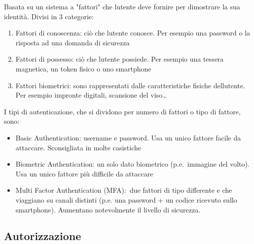 \documentclass[
]{article}
\providecommand{\tightlist}{%
  \setlength{\itemsep}{0pt}\setlength{\parskip}{0pt}}
\begin{document}
{Basata su un sistema a "fattori" che l\textquotesingle utente deve
fornire per dimostrare la sua identità. Divisi in 3 categorie:}

\begin{enumerate}
\tightlist
\item
  {Fattori di conoscenza}{: }{ciò che l\textquotesingle utente
  conosce}{. Per esempio una password o la risposta ad una domanda di
  sicurezza }
\end{enumerate}

{}

\begin{enumerate}
\setcounter{enumi}{1}
\tightlist
\item
  {Fattori di possesso}{: }{ciò che l\textquotesingle utente possiede}{.
  Per esempio una tessera magnetica, un token fisico o uno smartphone }
\item
  {Fattori biometrici}{: sono rappresentati dalle }{caratteristiche
  fisiche dell\textquotesingle utente}{. Per esempio impronte digitali,
  scansione del viso\ldots{}}
\end{enumerate}

{}

{I tipi di autenticazione, che si dividono per numero di fattori o tipo
di fattore, sono:}

\begin{itemize}
\tightlist
\item
  {Basic Authentication}{: username e password. Usa un unico fattore
  facile da attaccare. Sconsigliata in molte casistiche }
\end{itemize}

{}

\begin{itemize}
\tightlist
\item
  {Biometric Authentication}{: un solo dato biometrico
  }{(p.e.}{~immagine del volto). Usa un unico fattore più difficile da
  attaccare }
\end{itemize}

{}

\begin{itemize}
\tightlist
\item
  {Multi Factor Authentication (MFA):}{~due fattori di tipo differente e
  che viaggiano su canali distinti (p.e. una password + un codice
  ricevuto sullo smartphone). Aumentano notevolmente il livello di
  sicurezza.}
\end{itemize}

{}

\subsection{\texorpdfstring{{Autorizzazione}}{Autorizzazione}}\label{h.vwpqjb8hrdvb}
\end{document}
